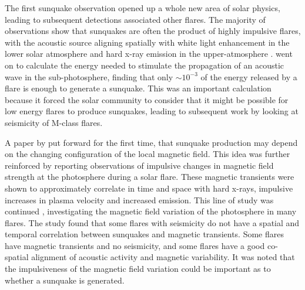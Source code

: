 The first sunquake observation opened up a whole new area of solar physics, leading to subsequent detections associated other flares. The majority of observations show that sunquakes are often the product of highly impulsive flares, with the acoustic source aligning spatially with white light enhancement in the lower solar atmosphere and hard x-ray emission in the upper-atmosphere \citep{2005ApJ...630.1168D, 2007ApJ...664..573Z}. \cite{2005ApJ...630.1168D} went on to calculate the energy needed to stimulate the propagation of an acoustic wave in the sub-photosphere, finding that only $\sim10^{-3}$ of the energy released by a flare is enough to generate a sunquake. This was an important calculation because it forced the solar community to consider that it might be possible for low energy flares to produce sunquakes, leading to subsequent work by \cite{2008SoPh..251..613M} looking at seismicity of M-class flares.

A paper by \cite{2000ApJ...531L..75H} put forward for the first time, that sunquake production may depend on the changing configuration of the local magnetic field. This idea was further reinforced by \cite{2001ApJ...550L.105K} reporting observations of impulsive changes in magnetic field strength at the photosphere during a solar flare. These magnetic transients were shown to approximately correlate in time and space with hard x-rays, impulsive increases in plasma velocity and increased emission. This line of study was continued \citep{2009MNRAS.395L..39M}, investigating the magnetic field variation of the photosphere in many flares. The study found that some flares with seismicity do not have a spatial and temporal correlation between sunquakes and magnetic transients. Some flares have magnetic transients and no seismicity, and some flares have a good co-spatial alignment of acoustic activity and magnetic variability. It was noted that the impulsiveness of the magnetic field variation could be important as to whether a sunquake is generated.

